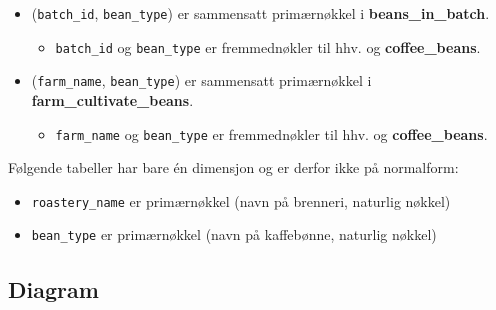 

\vspace{-0.7cm}

\begin{itemize}
    \item (\verb|batch_id|, \verb|bean_type|) er sammensatt primærnøkkel i {\textbf{\ttfamily beans\_in\_batch}}.
    \begin{itemize}
        \item \verb|batch_id| og \verb|bean_type| er fremmednøkler til hhv.  og {\textbf{\ttfamily coffee\_beans}}.
    \end{itemize}
    \item (\verb|farm_name|, \verb|bean_type|) er sammensatt primærnøkkel i {\textbf{\ttfamily farm\_cultivate\_beans}}.
    \begin{itemize}
        \item \verb|farm_name| og \verb|bean_type| er fremmednøkler til hhv.  og {\textbf{\ttfamily coffee\_beans}}.
    \end{itemize}
\end{itemize}

Følgende tabeller har bare én dimensjon og er derfor ikke på normalform:



\begin{itemize}
    \item \verb|roastery_name| er primærnøkkel (navn på brenneri, naturlig nøkkel)
    \item \verb|bean_type| er primærnøkkel (navn på kaffebønne, naturlig nøkkel)
\end{itemize}

\pagebreak

\subsection{Diagram}

\vspace{1cm}


